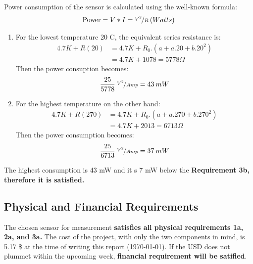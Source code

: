 Power consumption of the sensor is calculated using the well-known formula:
\begin{equation}
    \text{Power} = V * I = \nicefrac{V^2}{R} \: (Watts)
\end{equation}
\begin{enumerate}
    \item For the lowest temperature 20 \degree C, the equivalent series resistance is:
    \begin{align}
        4.7K + R(20) &= 4.7K + R_0.(a + a.20 + b.20^2) \\
        &= 4.7K + 1078 = 5778 \Omega
    \end{align}
    Then the power consuption becomes:
    \begin{align}
        \frac{25}{5778} \: \nicefrac{V^2}{Amp} = 43 \: mW
    \end{align}

    \item For the highest temperature on the other hand:
    \begin{align}
        4.7K + R(270) &= 4.7K + R_0.(a + a.270 + b.270^2) \\
        & = 4.7K + 2013 = 6713 \Omega
    \end{align}
    Then the power consumption becomes:
    \begin{align}
        \frac{25}{6713} \: \nicefrac{V^2}{Amp} = 37 \: mW
    \end{align}
\end{enumerate}

The highest consumption is 43 mW and it s 7 mW below the \textbf{Requirement 3b, therefore it is satisfied.}

\subsection*{Physical and Financial Requirements}
The chosen sensor for measurement \textbf{satisfies all physical requirements 1a, 2a, and 3a.} The cost of the project, with only the two components in mind, is 5.17 \$ at the time of writing this report (\today). If the USD does not plummet within the upcoming week, \textbf{financial requirement will be satified}.

